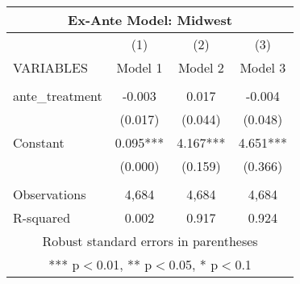 \begin{tabular}{lccc}
\multicolumn{4}{c}{Ex-Ante Model: Midwest} \\ \hline
 & (1) & (2) & (3) \\
VARIABLES & Model 1 & Model 2 & Model 3 \\ \hline
 &  &  &  \\
ante\_treatment & -0.003 & 0.017 & -0.004 \\
 & (0.017) & (0.044) & (0.048) \\
Constant & 0.095*** & 4.167*** & 4.651*** \\
 & (0.000) & (0.159) & (0.366) \\
 &  &  &  \\
Observations & 4,684 & 4,684 & 4,684 \\
 R-squared & 0.002 & 0.917 & 0.924 \\ \hline
\multicolumn{4}{c}{ Robust standard errors in parentheses} \\
\multicolumn{4}{c}{ *** p$<$0.01, ** p$<$0.05, * p$<$0.1} \\
\end{tabular}
